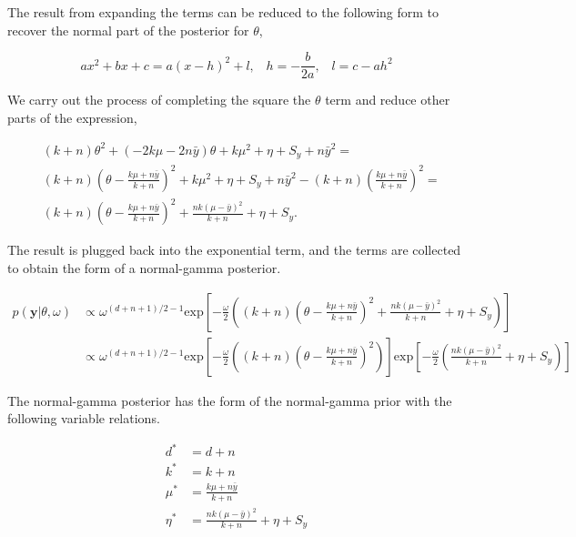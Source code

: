 \documentclass[10pt]{article}
\newcommand{\by}{\mathbf{y}}
\begin{document}
\begin{enumerate}[label=(\Alph*)]
        The result from expanding the terms can be reduced to the following form to recover the normal part of the posterior for $\theta$,

        $$ax^2 + bx + c = a(x - h)^2 + l, \hspace{10pt} h = -\frac{b}{2a}, \hspace{10pt} l = c - a h^2$$

        We carry out the process of completing the square the $\theta$ term and reduce other parts of the expression,

        \begin{align*}
          & (k+n) \theta^2 + (-2k\mu - 2n\bar{y}) \theta + k \mu^2 + \eta + S_y + n \bar{y}^2 = \\
          &(k+n) \left( \theta - \frac{k\mu + n\bar{y}}{k+n}\right)^2 + k \mu^2 + \eta + S_y + n \bar{y}^2 - (k+n)\left( \frac{k\mu + n \bar{y}}{k+n}\right)^2 = \\
          & (k+n) \left( \theta - \frac{k\mu + n\bar{y}}{k+n}\right)^2 + \frac{nk(\mu - \bar{y})^2}{k+n} + \eta + S_y.
        \end{align*}

        The result is plugged back into the exponential term, and the terms are collected to obtain the form of a normal-gamma posterior.

        \begin{align*}
          p(\by| \theta, \omega) &\propto \omega^{(d+n+1)/2-1} \text{exp}\left[  -\frac{\omega}{2} \left( (k+n) \left( \theta - \frac{k\mu + n\bar{y}}{k+n}\right)^2 + \frac{nk(\mu - \bar{y})^2}{k+n} + \eta + S_y\right) \right] \\
          & \propto \omega^{(d+n+1)/2-1} \text{exp}\left[  -\frac{\omega}{2} \left( (k+n) \left( \theta - \frac{k\mu + n\bar{y}}{k+n}\right)^2 \right) \right] \text{exp}\left[ - \frac{\omega}{2}\left( \frac{nk(\mu - \bar{y})^2}{k+n} + \eta + S_y\right) \right]
        \end{align*}

        The normal-gamma posterior has the form of the normal-gamma prior with the following variable relations.

        \begin{align*}
          d^* &= d+n \\
          k^* &= k+n \\
          \mu^* &= \frac{k\mu + n\bar{y}}{k + n}\\
          \eta^* &= \frac{nk (\mu - \bar{y})^2}{k+n} + \eta + S_y
        \end{align*}



\end{enumerate}
\end{document}

